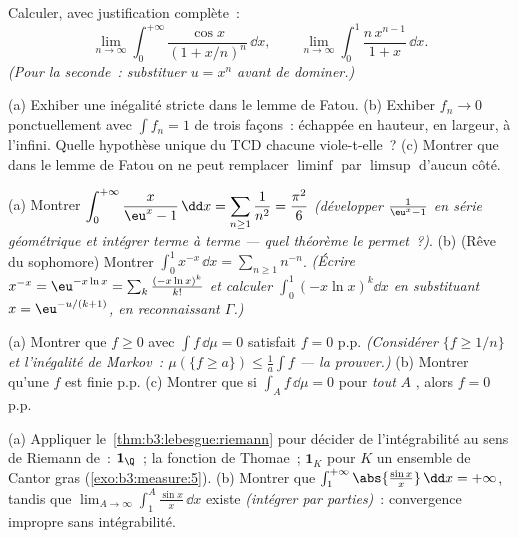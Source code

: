 \begin{exercise}[$\star$]\label{exo:b3:lebesgue:2}
Calculer, avec justification complète~:
\[
\lim_{n\to\infty}\int_0^{+\infty}
\frac{\cos x}{(1 + x/n)^{n}}\,\dd x,
\qquad
\lim_{n\to\infty}\int_0^1 \frac{n\,x^{n-1}}{1 + x}\,\dd x .
\]
\emph{(Pour la seconde~: substituer $u = x^n$ avant de
dominer.)}
\end{exercise}

\begin{exercise}[$\star\star$]\label{exo:b3:lebesgue:3}
(a) Exhiber une inégalité stricte dans le lemme de Fatou.
(b) Exhiber $f_n \to 0$ ponctuellement avec $\int f_n = 1$
de trois façons~: échappée en hauteur, en largeur, à
l'infini. Quelle hypothèse unique du TCD chacune viole-t-elle~?
(c) Montrer que dans le lemme de Fatou on ne peut remplacer
$\liminf$ par $\limsup$ d'aucun côté.
\end{exercise}

\begin{exercise}[$\star\star$]\label{exo:b3:lebesgue:4}
(a) Montrer $\displaystyle\int_0^{+\infty}\frac{x}{\eu^x -
1}\,\dd x = \sum_{n\geq1}\frac1{n^2} = \frac{\pi^2}6$
\emph{(développer $\frac1{\eu^x - 1}$ en série géométrique
et intégrer terme à terme --- quel théorème le permet~?)}.
(b) (Rêve du sophomore) Montrer
$\displaystyle\int_0^1 x^{-x}\,\dd x = \sum_{n\geq1}n^{-n}$.
\emph{(Écrire $x^{-x} = \eu^{-x\ln x} = \sum_k\frac{(-x\ln
x)^k}{k!}$ et calculer $\int_0^1(-x\ln x)^k\dd x$ en
substituant $x = \eu^{-u/(k+1)}$, en reconnaissant
$\Gamma$.)}
\end{exercise}

\begin{exercise}[$\star\star$]\label{exo:b3:lebesgue:5}
(a) Montrer que $f \geq 0$  avec $\int f\,\dd\mu =
0$ satisfait $f = 0$ p.p. \emph{(Considérer $\{f \geq 1/n\}$
et l'inégalité de Markov~: $\mu(\{f \geq a\}) \leq
\frac1a\int f$ --- la prouver.)}
(b) Montrer qu'une $f$  est finie p.p.
(c) Montrer que si $\int_A f\,\dd\mu = 0$ pour \emph{tout}
$A$ , alors $f = 0$ p.p.
\end{exercise}

\begin{exercise}[$\star\star$]\label{exo:b3:lebesgue:6}
(a) Appliquer le~\cref{thm:b3:lebesgue:riemann} pour
décider de l'intégrabilité au sens de Riemann de~: $\mathbf
1_\Q$~; la fonction de Thomae~; $\mathbf 1_K$ pour $K$ un
ensemble de Cantor gras (\cref{exo:b3:measure:5}).
(b) Montrer que $\int_1^{+\infty}\abs{\frac{\sin
x}x}\,\dd x = +\infty$, tandis que
$\lim_{A\to\infty}\int_1^A\frac{\sin x}x\,\dd x$ existe
\emph{(intégrer par parties)}~: convergence impropre sans
intégrabilité.
\end{exercise}

